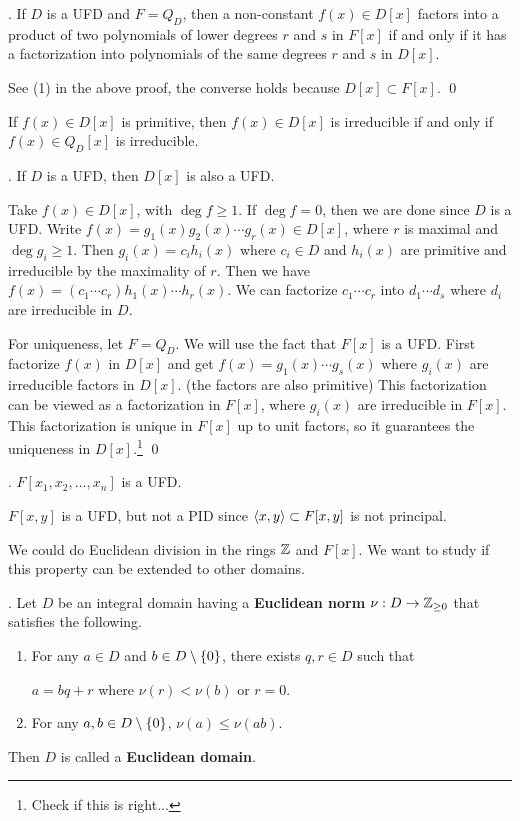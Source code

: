 \cor. If \(D\) is a UFD and \(F = Q_D\), then a non-constant \(f(x) \in D[x]\) factors into a product of two polynomials of lower degrees \(r\) and \(s\) in \(F[x]\) if and only if it has a factorization into polynomials of the same degrees \(r\) and \(s\) in \(D[x]\).

\pf See (1) in the above proof, the converse holds because \(D[x] \subset F[x]\). \qed

\rmk If \(f(x) \in D[x]\) is primitive, then \(f(x) \in D[x]\) is irreducible if and only if \(f(x) \in Q_D[x]\) is irreducible.

\thm. If \(D\) is a UFD, then \(D[x]\) is also a UFD.

\pf Take \(f(x) \in D[x]\), with \(\deg f \geq 1\). If \(\deg f = 0\), then we are done since \(D\) is a UFD. Write \(f(x) = g_1(x) g_2(x) \cdots g_r(x) \in D[x]\), where \(r\) is maximal and \(\deg g_i \geq 1\). Then \(g_i(x) = c_ih_i(x)\) where \(c_i \in D\) and \(h_i(x)\) are primitive and irreducible by the maximality of \(r\). Then we have \(f(x) = (c_1 \cdots c_r)h_1(x) \cdots h_r(x)\). We can factorize \(c_1 \cdots c_r\) into \(d_1 \cdots d_s\) where \(d_i\) are irreducible in \(D\).

For uniqueness, let \(F = Q_D\). We will use the fact that \(F[x]\) is a UFD. First factorize \(f(x)\) in \(D[x]\) and get \(f(x) = g_1(x) \cdots g_s(x)\) where \(g_i(x)\) are irreducible factors in \(D[x]\). (the factors are also primitive) This factorization can be viewed as a factorization in \(F[x]\), where \(g_i(x)\) are irreducible in \(F[x]\). This factorization is unique in \(F[x]\) up to unit factors, so it guarantees the uniqueness in \(D[x]\).\footnote{Check if this is right...} \qed

\cor. \(F[x_1, x_2, \dots, x_n]\) is a UFD.

\rmk \(F[x, y]\) is a UFD, but not a PID since \(\left\langle x, y \right\rangle \subset F[x, y]\) is not principal.

\pagebreak


We could do Euclidean division in the rings \(\mathbb{Z}\) and \(F[x]\). We want to study if this property can be extended to other domains.

.  Let \(D\) be an integral domain having a \textbf{Euclidean norm} \(\nu : D \rightarrow \mathbb{Z}_{\geq 0}\) that satisfies the following.
\begin{enumerate}
    \item For any \(a \in D\) and \(b \in D \setminus \{0\}\), there exists \(q, r \in D\) such that
    \begin{center}
        \(a = bq + r\) \quad where \quad \(\nu(r) < \nu(b)\) or \(r = 0\).
    \end{center}
    \item For any \(a, b \in D \setminus \{0\}\), \(\nu(a) \leq \nu(ab)\).
\end{enumerate}
Then \(D\) is called a \textbf{Euclidean domain}.


